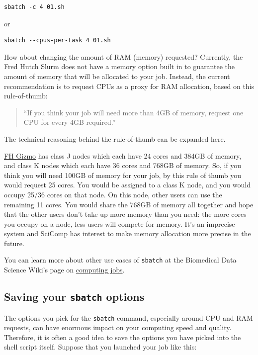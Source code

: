 \documentclass[
]{book}
\begin{document}
\begin{verbatim}
sbatch -c 4 01.sh
\end{verbatim}

or

\begin{verbatim}
sbatch --cpus-per-task 4 01.sh
\end{verbatim}

How about changing the amount of RAM (memory) requested? Currently, the Fred Hutch Slurm does not have a memory option built in to guarantee the amount of memory that will be allocated to your job. Instead, the current recommendation is to request CPUs as a proxy for RAM allocation, based on this rule-of-thumb:

\begin{quote}
``If you think your job will need more than 4GB of memory, request one CPU for every 4GB required.''
\end{quote}

The technical reasoning behind the rule-of-thumb can be expanded here.

\href{https://sciwiki.fredhutch.org/scicomputing/compute_platforms/\#gizmo}{FH Gizmo} has class J nodes which each have 24 cores and 384GB of memory, and class K nodes which each have 36 cores and 768GB of memory. So, if you think you will need 100GB of memory for your job, by this rule of thumb you would request 25 cores. You would be assigned to a class K node, and you would occupy 25/36 cores on that node. On this node, other users can use the remaining 11 cores. You would share the 768GB of memory all together and hope that the other users don't take up more memory than you need: the more cores you occupy on a node, less users will compete for memory. It's an imprecise system and SciComp has interest to make memory allocation more precise in the future.

You can learn more about other use cases of \texttt{sbatch} at the Biomedical Data Science Wiki's page on \href{https://sciwiki.fredhutch.org/scicomputing/compute_jobs/\#submitting-jobs}{computing jobs}.

\hypertarget{saving-your-sbatch-options}{%
\subsection{\texorpdfstring{Saving your \texttt{sbatch} options}{Saving your sbatch options}}\label{saving-your-sbatch-options}}

The options you pick for the \texttt{sbatch} command, especially around CPU and RAM requests, can have enormous impact on your computing speed and quality. Therefore, it is often a good idea to save the options you have picked into the shell script itself. Suppose that you launched your job like this:
\end{document}
